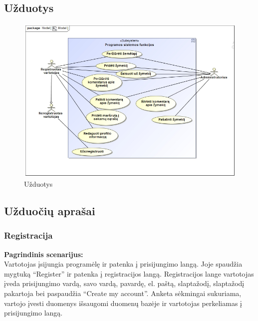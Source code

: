 \documentclass{VUMIFPSkursinis}
\begin{document}
\subsection{Užduotys}
	\begin{figure}[H]
				\centering
				\includegraphics[scale=0.5]{img/uzduotys}
				\caption{Užduotys}
				\label{img:uzduotys}
			\end{figure}

\subsection{Užduočių aprašai}
\subsubsection{Registracija}
	\textbf{Pagrindinis scenarijus:}\\
	Vartotojas įsijungia programėlę ir patenka į prisijungimo langą. Joje spaudžia mygtuką “Register” ir patenka į registracijos langą. 
	Registracijos lange vartotojas įveda prisijungimo vardą, savo vardą, pavardę, el. paštą, slaptažodį, slaptažodį pakartoja bei paspaudžia 
	“Create my account”. Anketa sėkmingai sukuriama, vartojo įvesti duomenys išsaugomi duomenų bazėje ir vartotojas perkeliamas į prisijungimo langą.
\end{document}
